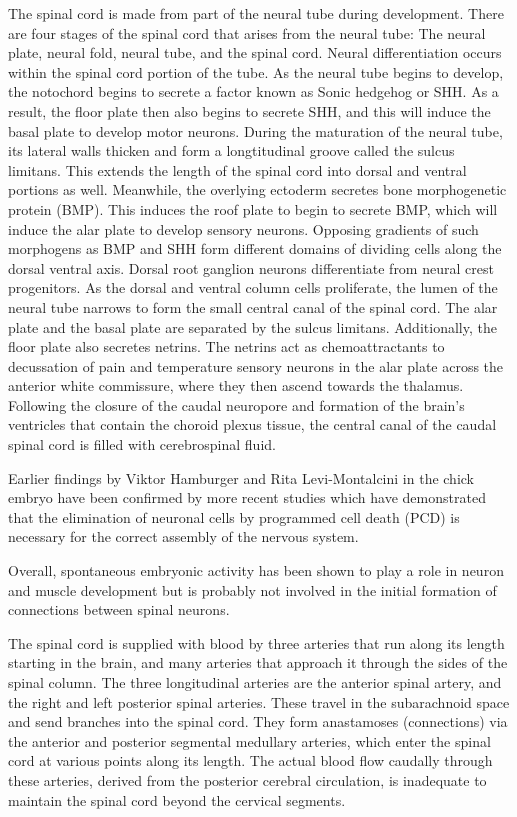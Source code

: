 \documentclass[]{book}
\begin{document}
The spinal cord is made from part of the neural tube during development. There are four stages of the spinal cord that arises from the neural tube: The neural plate, neural fold, neural tube, and the spinal cord. Neural differentiation occurs within the spinal cord portion of the tube. As the neural tube begins to develop, the notochord begins to secrete a factor known as Sonic hedgehog or SHH. As a result, the floor plate then also begins to secrete SHH, and this will induce the basal plate to develop motor neurons. During the maturation of the neural tube, its lateral walls thicken and form a longtitudinal groove called the sulcus limitans. This extends the length of the spinal cord into dorsal and ventral portions as well. Meanwhile, the overlying ectoderm secretes bone morphogenetic protein (BMP). This induces the roof plate to begin to secrete BMP, which will induce the alar plate to develop sensory neurons. Opposing gradients of such morphogens as BMP and SHH form different domains of dividing cells along the dorsal ventral axis. Dorsal root ganglion neurons differentiate from neural crest progenitors. As the dorsal and ventral column cells proliferate, the lumen of the neural tube narrows to form the small central canal of the spinal cord. The alar plate and the basal plate are separated by the sulcus limitans. Additionally, the floor plate also secretes netrins. The netrins act as chemoattractants to decussation of pain and temperature sensory neurons in the alar plate across the anterior white commissure, where they then ascend towards the thalamus. Following the closure of the caudal neuropore and formation of the brain's ventricles that contain the choroid plexus tissue, the central canal of the caudal spinal cord is filled with cerebrospinal fluid.

Earlier findings by Viktor Hamburger and Rita Levi-Montalcini in the chick embryo have been confirmed by more recent studies which have demonstrated that the elimination of neuronal cells by programmed cell death (PCD) is necessary for the correct assembly of the nervous system.

Overall, spontaneous embryonic activity has been shown to play a role in neuron and muscle development but is probably not involved in the initial formation of connections between spinal neurons.

The spinal cord is supplied with blood by three arteries that run along its length starting in the brain, and many arteries that approach it through the sides of the spinal column. The three longitudinal arteries are the anterior spinal artery, and the right and left posterior spinal arteries. These travel in the subarachnoid space and send branches into the spinal cord. They form anastamoses (connections) via the anterior and posterior segmental medullary arteries, which enter the spinal cord at various points along its length. The actual blood flow caudally through these arteries, derived from the posterior cerebral circulation, is inadequate to maintain the spinal cord beyond the cervical segments.
\end{document}
